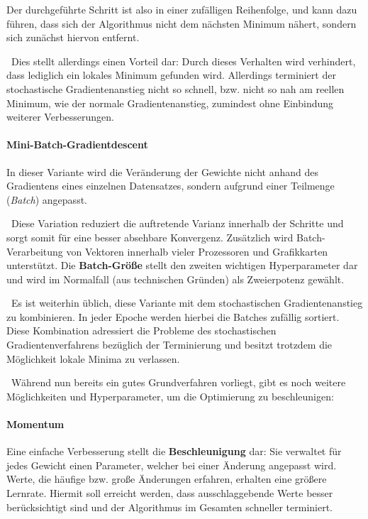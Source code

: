 Der durchgeführte Schritt ist also in einer zufälligen Reihenfolge, und kann dazu führen, dass sich der Algorithmus nicht dem nächsten Minimum nähert, sondern sich zunächst hiervon entfernt. 

~\newline Dies stellt allerdings einen Vorteil dar: Durch dieses Verhalten wird verhindert, dass lediglich ein lokales Minimum gefunden wird. Allerdings terminiert der stochastische Gradientenanstieg nicht so schnell, bzw. nicht so nah am reellen Minimum, wie der normale Gradientenanstieg, zumindest ohne Einbindung weiterer Verbesserungen.

\paragraph{Mini-Batch-Gradientdescent} In dieser Variante wird die Veränderung der Gewichte nicht anhand des Gradientens eines einzelnen Datensatzes, sondern aufgrund einer Teilmenge (\textit{Batch}) angepasst. 

~\newline Diese Variation reduziert die auftretende Varianz innerhalb der Schritte und sorgt somit für eine besser absehbare Konvergenz. Zusätzlich wird Batch-Verarbeitung von Vektoren innerhalb vieler Prozessoren und Grafikkarten unterstützt. Die \textbf{Batch-Größe} stellt den zweiten wichtigen Hyperparameter dar und wird im Normalfall (aus technischen Gründen) als Zweierpotenz gewählt.   

~\newline Es ist weiterhin üblich, diese Variante mit dem stochastischen Gradientenanstieg zu kombinieren. In jeder Epoche werden hierbei die Batches zufällig sortiert. Diese Kombination adressiert die Probleme des stochastischen Gradientenverfahrens bezüglich der Terminierung und besitzt trotzdem die Möglichkeit lokale Minima zu verlassen.  

~\newline Während nun bereits ein gutes Grundverfahren vorliegt, gibt es noch weitere Möglichkeiten und Hyperparameter, um die Optimierung zu beschleunigen:

\paragraph{Momentum} Eine einfache Verbesserung stellt die \textbf{Beschleunigung} dar: Sie verwaltet für jedes Gewicht einen Parameter, welcher bei einer Änderung angepasst wird. Werte, die häufige bzw. große Änderungen erfahren, erhalten eine größere Lernrate. Hiermit soll erreicht werden, dass ausschlaggebende Werte besser berücksichtigt sind und der Algorithmus im Gesamten schneller terminiert. 

